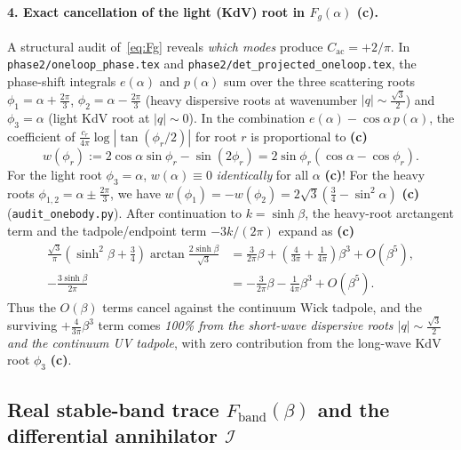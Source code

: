 \documentclass[11pt,a4paper]{article}
\newcommand{\claim}[1]{\textbf{(#1)}}
\begin{document}
\paragraph{4. Exact cancellation of the light (KdV) root in $F_g(\alpha)$ \claim{c}.}
A structural audit of~\eqref{eq:Fg} reveals \emph{which modes} produce $C_{\mathrm{ac}} = +2/\pi$.
In \texttt{phase2/oneloop\_phase.tex} and \texttt{phase2/det\_projected\_oneloop.tex}, the phase-shift
integrals $e(\alpha)$ and $p(\alpha)$ sum over the three scattering roots
$\phi_1 = \alpha + \frac{2\pi}{3}$, $\phi_2 = \alpha - \frac{2\pi}{3}$ (heavy dispersive roots at
wavenumber $|q|\sim \frac{\sqrt{3}}{2}$) and $\phi_3 = \alpha$ (light KdV root at $|q|\sim 0$).
In the combination $e(\alpha) - \cos\alpha\,p(\alpha)$, the coefficient of $\frac{c_r}{4\pi}\log|\tan(\phi_r/2)|$
for root $r$ is proportional to \claim{c}
\begin{equation}
  w(\phi_r) := 2\cos\alpha\sin\phi_r - \sin(2\phi_r) = 2\sin\phi_r(\cos\alpha - \cos\phi_r).
  \label{eq:log-weight}
\end{equation}
For the light root $\phi_3 = \alpha$, $w(\alpha) \equiv 0$ \emph{identically} for all $\alpha$ \claim{c}!
For the heavy roots $\phi_{1,2} = \alpha \pm \frac{2\pi}{3}$, we have
$w(\phi_1) = -w(\phi_2) = 2\sqrt{3}(\frac{3}{4}-\sin^2\alpha)$ \claim{c} (\texttt{audit\_onebody.py}).
After continuation to $k = \sinh\beta$, the heavy-root arctangent term and the tadpole/endpoint term
$-3k/(2\pi)$ expand as \claim{c}
\begin{align}
  \frac{\sqrt{3}}{\pi}\left(\sinh^2\beta + \frac{3}{4}\right)\arctan\frac{2\sinh\beta}{\sqrt{3}}
  &= \frac{3}{2\pi}\beta + \left(\frac{4}{3\pi} + \frac{1}{4\pi}\right)\beta^3 + O(\beta^5), \\
  -\frac{3\sinh\beta}{2\pi}
  &= -\frac{3}{2\pi}\beta - \frac{1}{4\pi}\beta^3 + O(\beta^5).
\end{align}
Thus the $O(\beta)$ terms cancel against the continuum Wick tadpole, and the surviving $+\frac{4}{3\pi}\beta^3$
term comes \emph{100\% from the short-wave dispersive roots $|q|\sim\frac{\sqrt{3}}{2}$ and the continuum UV tadpole},
with zero contribution from the long-wave KdV root $\phi_3$ \claim{c}.

\subsection{Real stable-band trace $F_{\mathrm{band}}(\beta)$ and the differential annihilator $\mathcal{I}$}
\end{document}
